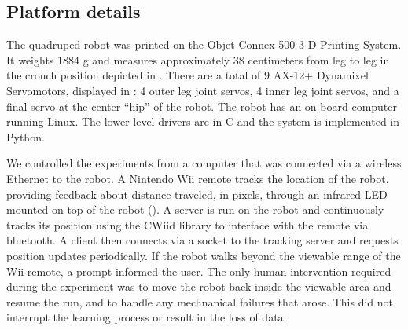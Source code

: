 \subsection{Platform details}













The quadruped robot was printed on the Objet
Connex 500 3-D Printing System. It weights 1884 g and measures approximately
38 centimeters from leg to leg in the crouch position depicted in
. There are a total of 9 AX-12+ Dynamixel
Servomotors, displayed in : 4 outer leg joint
servos, 4 inner leg joint servos, and a final servo at the center ``hip'' of the
robot. The robot has an on-board computer running Linux. 
The lower level drivers are in C and the system is implemented in Python. 


We controlled the experiments from a computer that was connected via a
wireless Ethernet to the robot. A Nintendo Wii remote tracks the location 
of the robot, providing feedback
about distance traveled, in pixels, through an infrared LED mounted on top of 
the robot (). A server is run on the robot and continuously tracks its
position using the CWiid library\cite{cwiid} to interface with the remote
via bluetooth. A client then connects via a socket to the tracking
server and requests position updates periodically. If the robot walks 
beyond the viewable range of the Wii remote, a prompt informed the
user. The only human intervention required during the
experiment was to move the robot back inside the viewable area and resume
the run, and to handle any mechnanical failures that arose. This did not
interrupt the learning process or result in the loss of data.

